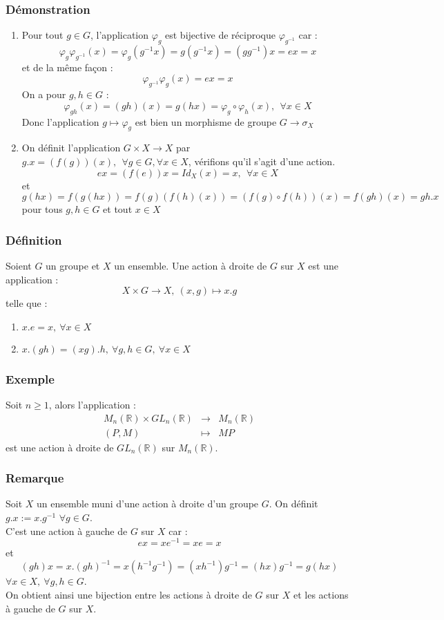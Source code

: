 \documentclass[a4paper, oneside]{report}
\newcommand{\x}{\times}
\newcommand{\R}{\mathbb{R}}
\newcommand{\defi}{\subsubsection{Définition}}
\newcommand{\dem}{\subsubsection{Démonstration}}
\newcommand{\remar}{\subsubsection{Remarque}}
\newcommand{\exem}{\subsubsection{Exemple}}
\begin{document}
\dem
\begin{enumerate}
\item Pour tout $g\in G$, l'application $\varphi_g$ est bijective de réciproque $\varphi_{g^{-1}}$ car :
$$\varphi_g\varphi_{g^{-1}}(x)=\varphi_g(g^{-1}x)=g(g^{-1}x)=(gg^{-1})x=ex=x$$
et de la même façon :
$$\varphi_{g^{-1}}\varphi_g(x)=ex=x$$
On a pour $g,h\in G$ :
$$\varphi_{gh}(x)=(gh)(x)=g(hx)=\varphi_g\circ \varphi_h(x),~~\forall x\in X$$
Donc l'application $g\mapsto \varphi_g$ est bien un morphisme de groupe $G\rightarrow \sigma_X$
\item On définit l'application $G\x X \rightarrow X$ par $g.x = (f(g))(x),~~\forall g\in G,\forall x\in X$, vérifions qu'il s'agit d'une action.\\
$$ex=(f(e))x=Id_X(x)=x,~~\forall x\in X$$
et 
$$g(hx)=f(g(hx))=f(g)(f(h)(x))=(f(g)\circ f(h) )(x)=f(gh)(x)=gh.x$$
pour tous $g,h\in G$ et tout $x\in X$
\end{enumerate}

\defi
Soient $G$ un groupe et $X$ un ensemble. Une action à droite de $G$ sur $X$ est une application :
$$X\x G\rightarrow X,~(x,g)\mapsto x.g$$
telle que :
\begin{enumerate}
\item $x.e=x,~\forall x\in X$
\item $x.(gh)=(xg).h,~\forall g,h\in G,~\forall x\in X$
\end{enumerate}

\exem
Soit $n\geq 1$, alors l'application :
$$\begin{array}{lll}
M_n(\R)\x GL_n(\R)&\rightarrow & M_n(\R)\\
(P,M)&\mapsto & MP
\end{array}$$
est une action à droite de $GL_n(\R)$ sur $M_n(\R)$.

\remar
Soit $X$ un ensemble muni d'une action à droite d'un groupe $G$. On définit $g.x := x.g^{-1}$ $\forall g\in G$.\\
C'est une action à gauche de $G$ sur $X$ car :
$$ex=xe^{-1}=xe=x$$
et 
$$(gh)x=x.(gh)^{-1}=x(h^{-1}g^{-1})=(xh^{-1})g^{-1}=(hx)g^{-1}=g(hx)$$
$\forall x\in X, ~\forall g,h\in G$.\\
On obtient ainsi une bijection entre les actions à droite de $G$ sur $X$ et les actions à gauche de $G$ sur $X$.
\end{document}
